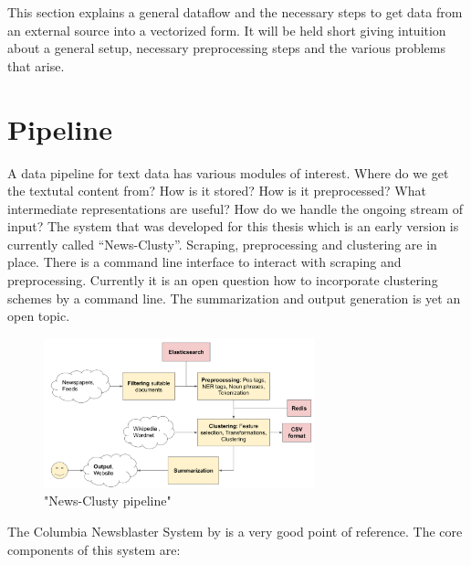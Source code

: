 
This section explains a general dataflow and the necessary steps to get data from an external source into a vectorized form. It will be held short giving intuition about a general setup, necessary preprocessing steps and the various problems that arise.

\section{Pipeline}
  A data pipeline for text data has various modules of interest. Where do we get the textutal content from? How is it stored? How is it preprocessed? What intermediate representations are useful? How do we handle the ongoing stream of input? The system that was developed for this thesis which is an early version is currently called ``News-Clusty''. Scraping, preprocessing and clustering are in place. There is a command line interface to interact with scraping and preprocessing. Currently it is an open question how to incorporate clustering schemes by a command line. The summarization and output generation is yet an open topic.

  \begin{figure}[h!]
    \centering
      \includegraphics[width=0.7\textwidth]{news_clusty.png}
      \caption{"News-Clusty pipeline"}
      \label{news_clusty}
  \end{figure}

  The Columbia Newsblaster System by \cite{ColumbiaMultiDoc2001} is a very good point of reference. The core components of this system are:

